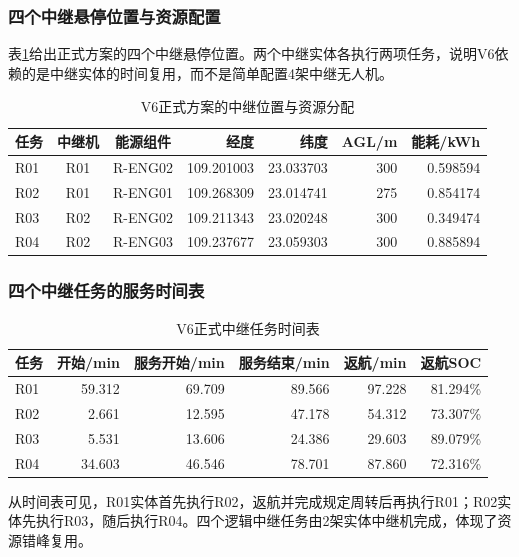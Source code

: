 \documentclass[UTF8,a4paper,12pt]{ctexart}
\begin{document}
\subsubsection{四个中继悬停位置与资源配置}

表\ref{tab:q3_relay_sites_v6}给出正式方案的四个中继悬停位置。两个中继实体各执行两项任务，说明V6依赖的是中继实体的时间复用，而不是简单配置4架中继无人机。

\begin{table}[H]
\centering
\caption{V6正式方案的中继位置与资源分配}
\label{tab:q3_relay_sites_v6}
\begin{tabular}{lccrrrr}
\toprule
任务 & 中继机 & 能源组件 & 经度 & 纬度 & AGL/m & 能耗/kWh\\
\midrule
R01 & R01 & R-ENG02 & 109.201003 & 23.033703 & 300 & 0.598594\\
R02 & R01 & R-ENG01 & 109.268309 & 23.014741 & 275 & 0.854174\\
R03 & R02 & R-ENG02 & 109.211343 & 23.020248 & 300 & 0.349474\\
R04 & R02 & R-ENG03 & 109.237677 & 23.059303 & 300 & 0.885894\\
\bottomrule
\end{tabular}
\end{table}

\subsubsection{四个中继任务的服务时间表}

\begin{table}[H]
\centering
\caption{V6正式中继任务时间表}
\label{tab:q3_relay_timeline_v6}
\begin{tabular}{lrrrrr}
\toprule
任务 & 开始/min & 服务开始/min & 服务结束/min & 返航/min & 返航SOC\\
\midrule
R01 & 59.312 & 69.709 & 89.566 & 97.228 & 81.294\%\\
R02 & 2.661 & 12.595 & 47.178 & 54.312 & 73.307\%\\
R03 & 5.531 & 13.606 & 24.386 & 29.603 & 89.079\%\\
R04 & 34.603 & 46.546 & 78.701 & 87.860 & 72.316\%\\
\bottomrule
\end{tabular}
\end{table}

从时间表可见，R01实体首先执行R02，返航并完成规定周转后再执行R01；R02实体先执行R03，随后执行R04。四个逻辑中继任务由2架实体中继机完成，体现了资源错峰复用。
\end{document}
